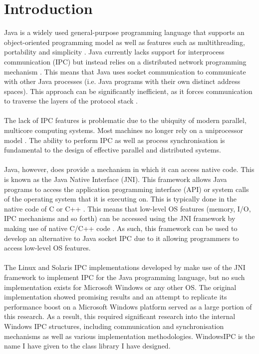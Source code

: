 \documentclass[12pt] {newrucsthesis}    %
\begin{document}
  \tableofcontents
    \newpage

  \listoffigures
    \newpage

  \listoftables
    \newpage


  \chapter{Introduction}
      Java is a widely used general-purpose programming language that supports an object-oriented
      programming model as well as features such as multithreading, portability and simplicity \citep{JavaIntro}.
      Java currently lacks support for interprocess communication (IPC) but instead relies on a distributed network
      programming mechanism  \citep{WellsIPCMultiProc}.
      This means that Java uses socket communication to communicate with other Java processes (i.e. Java programs
      with their own distinct address spaces). This approach can be significantly inefficient, as it forces
      communication to traverse the layers of the protocol stack \citep{WellsIPCJava}.
      \\\\
      The lack of IPC features is problematic due to the ubiquity of modern parallel, multicore computing systems.
      Most machines no longer rely on a uniprocessor model \citep{hayes2007computing}.
      The ability to perform IPC as well as process synchronisation is fundamental to the design of effective
      parallel and distributed systems.
      \\\\
      Java, however, does provide a mechanism in which it can access native code. This is known as
      the Java Native Interface (JNI). This framework allows Java programs to access the application
      programming interface (API) or system calls of the operating system that it is executing on.
      This is typically done in the native code of C or C++ \citep{LiangJNISpecification}.
      This means that low-level OS features (memory, I/O, IPC mechanisms and so forth) can be accessed using the
      JNI framework by making use of native C/C++ code \citep{IBM2009}. As such, this framework can be
      used to develop an alternative to Java socket IPC due to it allowing programmers to access low-level
      OS features.
      \\\\
      The Linux and Solaris IPC implementations developed by \cite{WellsIPCJava} make use of the JNI framework
      to implement IPC for the Java programming language, but no such implementation exists for Microsoft Windows
      or any other OS. The original implementation showed promising results and an attempt to
      replicate its performance boost on a Microsoft Windows platform served as a large
      portion of this research. As a result, this required significant research into
      the internal Windows IPC structures, including communication and synchronisation mechanisms as well as various
      implementation methodologies. WindowsIPC is the name I have given to the class library I have designed.
\end{document}
